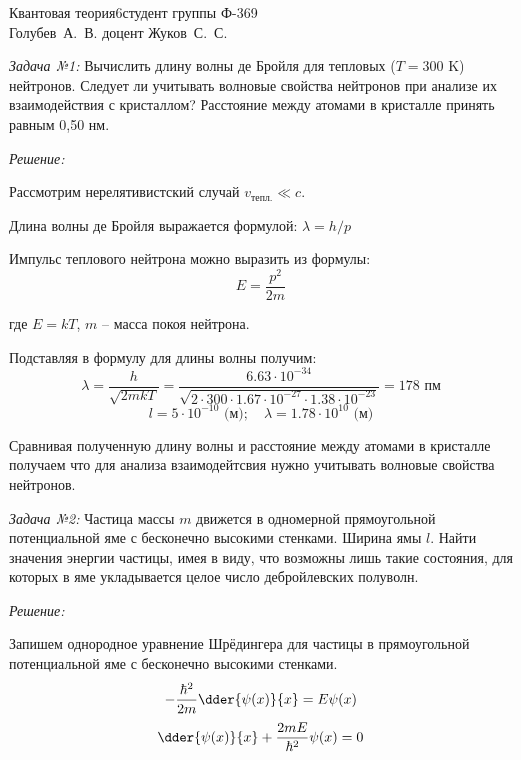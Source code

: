 



\usepackage{wrapfig}


{Квантовая теория}{}{6}{студент группы Ф-369\\Голубев~А.~В.}
{}{доцент Жуков~С.~С.}{}{}


\emph{Задача №1:} Вычислить длину волны де Бройля для тепловых 
(\( T = 300 \) K) нейтронов. Следует ли учитывать волновые свойства нейтронов 
при анализе их взаимодействия с кристаллом? Расстояние между атомами в 
кристалле принять равным 0,50 нм.

\emph{Решение:}

Рассмотрим нерелятивистский случай \( v_\text{тепл.} \ll c \).

Длина волны де Бройля выражается формулой: \( \lambda = h/p\)

Импульс теплового нейтрона можно выразить из формулы: 
\[	
	E = \frac{p^2}{2m}
\] 

где \( E = kT \), \( m \) -- масса покоя нейтрона.

Подставляя в формулу для длины волны получим:
\[
	\lambda = \frac{h}{\sqrt{2mkT}} = 
	\frac{6.63\cdot10^{-34}}
	{\sqrt{2\cdot300\cdot1.67\cdot10^{-27}\cdot1.38\cdot10^{-23}}} =
	178 \text{ пм}
\]
\[
	l = 5 \cdot 10^{-10} \text{ (м)};\quad
	\lambda = 1.78 \cdot 10^{10} \text{ (м)}
\]

Сравнивая полученную длину волны и расстояние между атомами в кристалле 
получаем что для анализа взаимодейтсвия нужно учитывать волновые свойства 
нейтронов.

\pagebreak

\emph{Задача №2:} Частица массы \( m \) движется в одномерной прямоугольной 
потенциальной яме с бесконечно высокими стенками. Ширина ямы \( l \). Найти 
значения энергии частицы, имея в виду, что возможны лишь такие состояния, для 
которых в яме укладывается целое число дебройлевских полуволн. 

\emph{Решение:}

Запишем однородное уравнение Шрёдингера для частицы в 
прямоугольной потенциальной яме с бесконечно высокими стенками.
\[
	-\frac{\hbar^2}{2m}\dder{\psi(x)}{x} = E\psi(x)
\] 
\[
	\dder{\psi(x)}{x}+\frac{2mE}{\hbar^2}\psi(x) = 0
\]

